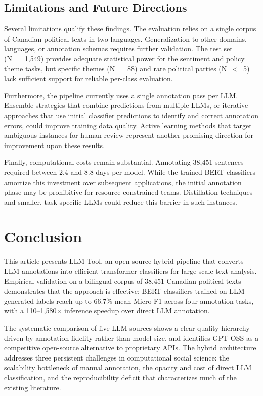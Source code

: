 \documentclass[12pt]{article}
\begin{document}
\subsection{Limitations and Future Directions}

Several limitations qualify these findings. The evaluation relies on a single corpus of Canadian political texts in two languages. Generalization to other domains, languages, or annotation schemas requires further validation. The test set (N~=~1,549) provides adequate statistical power for the sentiment and policy theme tasks, but specific themes (N~=~88) and rare political parties (N~$<$~5) lack sufficient support for reliable per-class evaluation.

Furthermore, the pipeline currently uses a single annotation pass per LLM. Ensemble strategies that combine predictions from multiple LLMs, or iterative approaches that use initial classifier predictions to identify and correct annotation errors, could improve training data quality. Active learning methods that target ambiguous instances for human review represent another promising direction for improvement upon these results.

Finally, computational costs remain substantial. Annotating 38,451 sentences required between 2.4 and 8.8 days per model. While the trained BERT classifiers amortize this investment over subsequent applications, the initial annotation phase may be prohibitive for resource-constrained teams. Distillation techniques and smaller, task-specific LLMs could reduce this barrier in such instances.

\section{Conclusion}

This article presents LLM Tool, an open-source hybrid pipeline that converts LLM annotations into efficient transformer classifiers for large-scale text analysis. Empirical validation on a bilingual corpus of 38,451 Canadian political texts demonstrates that the approach is effective: BERT classifiers trained on LLM-generated labels reach up to 66.7\% mean Micro F1 across four annotation tasks, with a 110--1,580$\times$ inference speedup over direct LLM annotation.

The systematic comparison of five LLM sources shows a clear quality hierarchy driven by annotation fidelity rather than model size, and identifies GPT-OSS as a competitive open-source alternative to proprietary APIs. The hybrid architecture addresses three persistent challenges in computational social science: the scalability bottleneck of manual annotation, the opacity and cost of direct LLM classification, and the reproducibility deficit that characterizes much of the existing literature.
\end{document}
